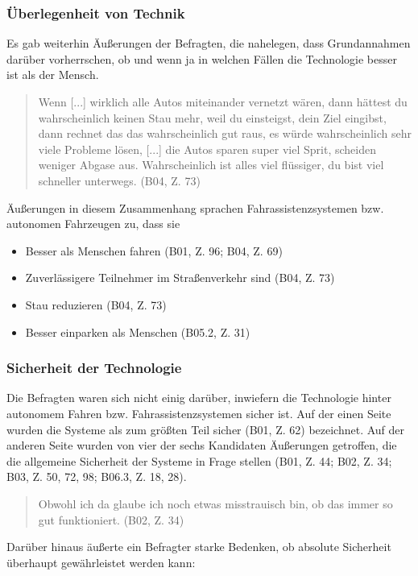 \documentclass[12pt]{article}
\begin{document}
\subsubsection*{Überlegenheit von Technik}
Es gab weiterhin Äußerungen der Befragten, die nahelegen, dass Grundannahmen darüber vorherrschen, ob und wenn ja in welchen Fällen die Technologie besser ist als der Mensch.

\begin{quote}
  Wenn [...] wirklich alle Autos miteinander vernetzt wären, dann hättest du wahrscheinlich keinen Stau mehr, weil du einsteigst, dein Ziel eingibst, dann rechnet das das wahrscheinlich gut raus, es würde wahrscheinlich sehr viele Probleme lösen, [...] die Autos sparen super viel Sprit, scheiden weniger Abgase aus. Wahrscheinlich ist alles viel flüssiger, du bist viel schneller unterwegs. (B04, Z. 73)
\end{quote}

Äußerungen in diesem Zusammenhang sprachen Fahrassistenzsystemen bzw. autonomen Fahrzeugen zu, dass sie

\begin{itemize}
  \item Besser als Menschen fahren (B01, Z. 96; B04, Z. 69)
  \item Zuverlässigere Teilnehmer im Straßenverkehr sind (B04, Z. 73)
  \item Stau reduzieren (B04, Z. 73)
  \item Besser einparken als Menschen (B05.2, Z. 31)
\end{itemize}

\subsubsection*{Sicherheit der Technologie}
Die Befragten waren sich nicht einig darüber, inwiefern die Technologie hinter autonomem Fahren bzw. Fahrassistenzsystemen sicher ist. Auf der einen Seite wurden die Systeme als \glqq zum größten Teil sicher\grqq{} (B01, Z. 62) bezeichnet. Auf der anderen Seite wurden von vier der sechs Kandidaten Äußerungen getroffen, die die allgemeine Sicherheit der Systeme in Frage stellen (B01, Z. 44; B02, Z. 34; B03, Z. 50, 72, 98; B06.3, Z. 18, 28).

\begin{quote}
  Obwohl ich da glaube ich noch etwas misstrauisch bin, ob das immer so gut funktioniert. (B02, Z. 34)
\end{quote}

Darüber hinaus äußerte ein Befragter starke Bedenken, ob absolute Sicherheit überhaupt gewährleistet werden kann:
\end{document}
